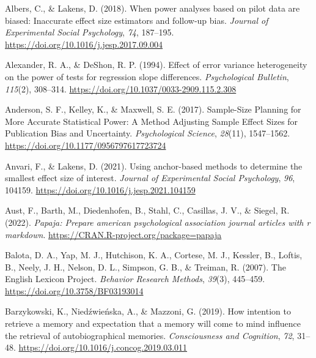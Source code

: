 \documentclass[
  man]{apa7}
\newlength{\cslhangindent}
\newlength{\cslentryspacingunit} %
\newenvironment{CSLReferences}[2] %
 {%
  \setlength{\parindent}{0pt}
  \ifodd #1
  \let\oldpar\par
  \def\par{\hangindent=\cslhangindent\oldpar}
  \fi
  \setlength{\parskip}{#2\cslentryspacingunit}
 }%
 {}
\begin{document}
\hypertarget{refs}{}
\begin{CSLReferences}{1}{0}
\leavevmode{}%
Albers, C., \& Lakens, D. (2018). When power analyses based on pilot data are biased: Inaccurate effect size estimators and follow-up bias. \emph{Journal of Experimental Social Psychology}, \emph{74}, 187--195. \url{https://doi.org/10.1016/j.jesp.2017.09.004}

\leavevmode{}%
Alexander, R. A., \& DeShon, R. P. (1994). Effect of error variance heterogeneity on the power of tests for regression slope differences. \emph{Psychological Bulletin}, \emph{115}(2), 308--314. \url{https://doi.org/10.1037/0033-2909.115.2.308}

\leavevmode{}%
Anderson, S. F., Kelley, K., \& Maxwell, S. E. (2017). Sample-Size Planning for More Accurate Statistical Power: A Method Adjusting Sample Effect Sizes for Publication Bias and Uncertainty. \emph{Psychological Science}, \emph{28}(11), 1547--1562. \url{https://doi.org/10.1177/0956797617723724}

\leavevmode{}%
Anvari, F., \& Lakens, D. (2021). Using anchor-based methods to determine the smallest effect size of interest. \emph{Journal of Experimental Social Psychology}, \emph{96}, 104159. \url{https://doi.org/10.1016/j.jesp.2021.104159}

\leavevmode{}%
Aust, F., Barth, M., Diedenhofen, B., Stahl, C., Casillas, J. V., \& Siegel, R. (2022). \emph{Papaja: Prepare american psychological association journal articles with r markdown}. \url{https://CRAN.R-project.org/package=papaja}

\leavevmode{}%
Balota, D. A., Yap, M. J., Hutchison, K. A., Cortese, M. J., Kessler, B., Loftis, B., Neely, J. H., Nelson, D. L., Simpson, G. B., \& Treiman, R. (2007). The English Lexicon Project. \emph{Behavior Research Methods}, \emph{39}(3), 445--459. \url{https://doi.org/10.3758/BF03193014}

\leavevmode{}%
Barzykowski, K., Niedźwieńska, A., \& Mazzoni, G. (2019). How intention to retrieve a memory and expectation that a memory will come to mind influence the retrieval of autobiographical memories. \emph{Consciousness and Cognition}, \emph{72}, 31--48. \url{https://doi.org/10.1016/j.concog.2019.03.011}


\end{CSLReferences}
\end{document}
